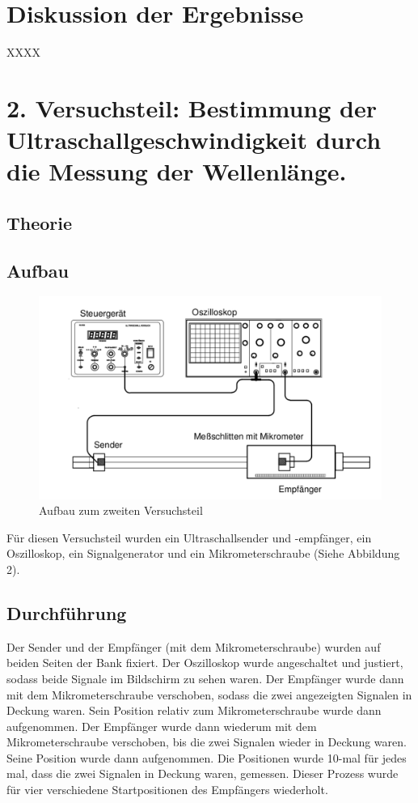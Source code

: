 \documentclass[11pt,a4paper]{article}
\begin{document}
\section{Diskussion der Ergebnisse}

XXXX

\pagebreak

\section{2. Versuchsteil: Bestimmung der Ultraschallgeschwindigkeit durch die Messung der Wellenlänge.}
\subsection{Theorie}
\subsection{Aufbau}
\begin{figure}
	\centering
	\includegraphics[scale=0.5]{Abb2}
	\caption{Aufbau zum zweiten Versuchsteil}
\end{figure}

Für diesen Versuchsteil wurden ein Ultraschallsender und -empfänger, ein Oszilloskop, ein Signalgenerator und ein Mikrometerschraube (Siehe Abbildung 2). 

\subsection{Durchführung}
Der Sender und der Empfänger (mit dem Mikrometerschraube) wurden auf beiden Seiten der Bank fixiert. Der Oszilloskop wurde angeschaltet und justiert, sodass beide Signale im Bildschirm zu sehen waren. Der Empfänger wurde dann mit dem Mikrometerschraube verschoben, sodass die zwei angezeigten Signalen in Deckung waren. Sein Position relativ zum Mikrometerschraube wurde dann aufgenommen. Der Empfänger wurde dann wiederum mit dem Mikrometerschraube verschoben, bis die zwei Signalen wieder in Deckung waren. Seine Position wurde dann aufgenommen. Die Positionen wurde 10-mal für jedes mal, dass die zwei Signalen in Deckung waren, gemessen. Dieser Prozess wurde für vier verschiedene Startpositionen des Empfängers wiederholt. 
\end{document}
